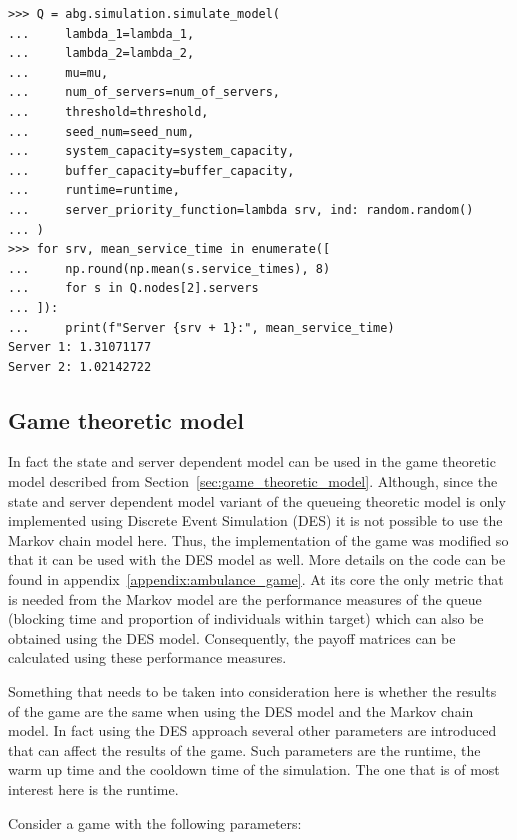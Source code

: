 \begin{lstlisting}[style=pystyle]
>>> Q = abg.simulation.simulate_model(
...     lambda_1=lambda_1,
...     lambda_2=lambda_2,
...     mu=mu,
...     num_of_servers=num_of_servers,
...     threshold=threshold,
...     seed_num=seed_num,
...     system_capacity=system_capacity,
...     buffer_capacity=buffer_capacity,
...     runtime=runtime,
...     server_priority_function=lambda srv, ind: random.random()
... )
>>> for srv, mean_service_time in enumerate([
...     np.round(np.mean(s.service_times), 8)
...     for s in Q.nodes[2].servers
... ]):
...     print(f"Server {srv + 1}:", mean_service_time)
Server 1: 1.31071177
Server 2: 1.02142722

\end{lstlisting}


\subsection{Game theoretic model}

In fact the state and server dependent model can be used in the game theoretic
model described from Section~\ref{sec:game_theoretic_model}.
Although, since the state and server dependent model variant of the queueing
theoretic model is only implemented using Discrete Event Simulation (DES) it is
not possible to use the Markov chain model here.
Thus, the implementation of the game was modified so that it can be used with
the DES model as well.
More details on the code can be found in appendix~\ref{appendix:ambulance_game}.
At its core the only metric that is needed from the Markov model are the
performance measures of the queue (blocking time and proportion of individuals
within target) which can also be obtained using the DES model.
Consequently, the payoff matrices can be calculated using these performance
measures.

Something that needs to be taken into consideration here is whether the results
of the game are the same when using the DES model and the Markov chain model.
In fact using the DES approach several other parameters are introduced that
can affect the results of the game.
Such parameters are the runtime, the warm up time and the cooldown time of the
simulation.
The one that is of most interest here is the runtime.

Consider a game with the following parameters:

